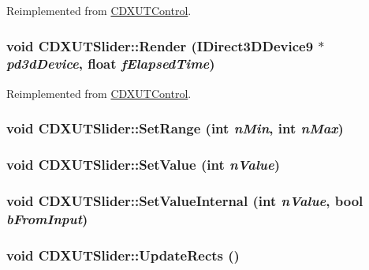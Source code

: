 Reimplemented from \hyperlink{class_c_d_x_u_t_control_a263979b3221cb7a44b4caea72366c335}{CDXUTControl}.\hypertarget{class_c_d_x_u_t_slider_aaddc1a6d901a7601792f2f40cbcce501}{
\subsubsection[{Render}]{\setlength{\rightskip}{0pt plus 5cm}void CDXUTSlider::Render (IDirect3DDevice9 $\ast$ {\em pd3dDevice}, \/  float {\em fElapsedTime})}}
\label{class_c_d_x_u_t_slider_aaddc1a6d901a7601792f2f40cbcce501}


Reimplemented from \hyperlink{class_c_d_x_u_t_control_afd92fa04241f66fdbf207bc5870c9388}{CDXUTControl}.\hypertarget{class_c_d_x_u_t_slider_a9401e45afcdd5c8f74e6120402ec068d}{
\subsubsection[{SetRange}]{\setlength{\rightskip}{0pt plus 5cm}void CDXUTSlider::SetRange ({\bf int} {\em nMin}, \/  {\bf int} {\em nMax})}}
\label{class_c_d_x_u_t_slider_a9401e45afcdd5c8f74e6120402ec068d}
\hypertarget{class_c_d_x_u_t_slider_a0f3442fdf18473cd6c7dd6f8d065ee9e}{
\subsubsection[{SetValue}]{\setlength{\rightskip}{0pt plus 5cm}void CDXUTSlider::SetValue ({\bf int} {\em nValue})}}
\label{class_c_d_x_u_t_slider_a0f3442fdf18473cd6c7dd6f8d065ee9e}
\hypertarget{class_c_d_x_u_t_slider_ab345296137df0bba5b421c5f0e58ca8e}{
\subsubsection[{SetValueInternal}]{\setlength{\rightskip}{0pt plus 5cm}void CDXUTSlider::SetValueInternal ({\bf int} {\em nValue}, \/  bool {\em bFromInput})}}
\label{class_c_d_x_u_t_slider_ab345296137df0bba5b421c5f0e58ca8e}
\hypertarget{class_c_d_x_u_t_slider_a091410aa578fc041b84e4173a969df58}{
\subsubsection[{UpdateRects}]{\setlength{\rightskip}{0pt plus 5cm}void CDXUTSlider::UpdateRects ()}}
\label{class_c_d_x_u_t_slider_a091410aa578fc041b84e4173a969df58}


